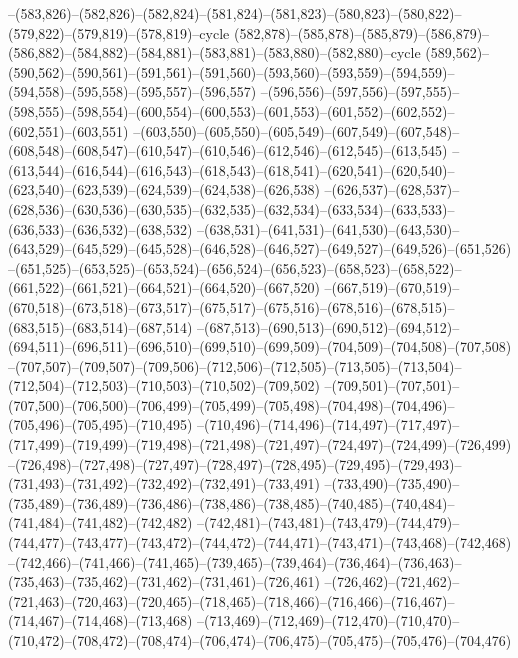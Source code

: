 --(583,826)--(582,826)--(582,824)--(581,824)--(581,823)--(580,823)--(580,822)--(579,822)--(579,819)--(578,819)--cycle
(582,878)--(585,878)--(585,879)--(586,879)--(586,882)--(584,882)--(584,881)--(583,881)--(583,880)--(582,880)--cycle
(589,562)--(590,562)--(590,561)--(591,561)--(591,560)--(593,560)--(593,559)--(594,559)--(594,558)--(595,558)--(595,557)--(596,557)
--(596,556)--(597,556)--(597,555)--(598,555)--(598,554)--(600,554)--(600,553)--(601,553)--(601,552)--(602,552)--(602,551)--(603,551)
--(603,550)--(605,550)--(605,549)--(607,549)--(607,548)--(608,548)--(608,547)--(610,547)--(610,546)--(612,546)--(612,545)--(613,545)
--(613,544)--(616,544)--(616,543)--(618,543)--(618,541)--(620,541)--(620,540)--(623,540)--(623,539)--(624,539)--(624,538)--(626,538)
--(626,537)--(628,537)--(628,536)--(630,536)--(630,535)--(632,535)--(632,534)--(633,534)--(633,533)--(636,533)--(636,532)--(638,532)
--(638,531)--(641,531)--(641,530)--(643,530)--(643,529)--(645,529)--(645,528)--(646,528)--(646,527)--(649,527)--(649,526)--(651,526)
--(651,525)--(653,525)--(653,524)--(656,524)--(656,523)--(658,523)--(658,522)--(661,522)--(661,521)--(664,521)--(664,520)--(667,520)
--(667,519)--(670,519)--(670,518)--(673,518)--(673,517)--(675,517)--(675,516)--(678,516)--(678,515)--(683,515)--(683,514)--(687,514)
--(687,513)--(690,513)--(690,512)--(694,512)--(694,511)--(696,511)--(696,510)--(699,510)--(699,509)--(704,509)--(704,508)--(707,508)
--(707,507)--(709,507)--(709,506)--(712,506)--(712,505)--(713,505)--(713,504)--(712,504)--(712,503)--(710,503)--(710,502)--(709,502)
--(709,501)--(707,501)--(707,500)--(706,500)--(706,499)--(705,499)--(705,498)--(704,498)--(704,496)--(705,496)--(705,495)--(710,495)
--(710,496)--(714,496)--(714,497)--(717,497)--(717,499)--(719,499)--(719,498)--(721,498)--(721,497)--(724,497)--(724,499)--(726,499)
--(726,498)--(727,498)--(727,497)--(728,497)--(728,495)--(729,495)--(729,493)--(731,493)--(731,492)--(732,492)--(732,491)--(733,491)
--(733,490)--(735,490)--(735,489)--(736,489)--(736,486)--(738,486)--(738,485)--(740,485)--(740,484)--(741,484)--(741,482)--(742,482)
--(742,481)--(743,481)--(743,479)--(744,479)--(744,477)--(743,477)--(743,472)--(744,472)--(744,471)--(743,471)--(743,468)--(742,468)
--(742,466)--(741,466)--(741,465)--(739,465)--(739,464)--(736,464)--(736,463)--(735,463)--(735,462)--(731,462)--(731,461)--(726,461)
--(726,462)--(721,462)--(721,463)--(720,463)--(720,465)--(718,465)--(718,466)--(716,466)--(716,467)--(714,467)--(714,468)--(713,468)
--(713,469)--(712,469)--(712,470)--(710,470)--(710,472)--(708,472)--(708,474)--(706,474)--(706,475)--(705,475)--(705,476)--(704,476)
